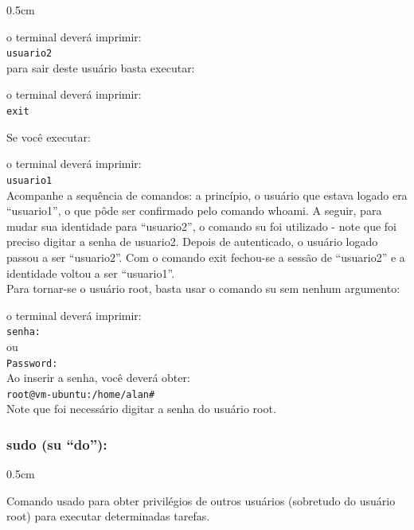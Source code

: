 \begin{refsection}
\begin {myindentpar}{0.5cm}
\begin{enumerate}[\itshape i.]
o terminal deverá imprimir:\\
\indent\indent\texttt{usuario2}
\\
para sair deste usuário basta executar:\\

o terminal deverá imprimir:\\
\texttt{exit}

Se você executar:\\

o terminal deverá imprimir:\\
\indent\indent\texttt{usuario1}\\

Acompanhe a sequência de comandos: a princípio, o usuário que estava logado era ``usuario1'', o que pôde ser confirmado pelo comando whoami. A seguir, para mudar sua identidade para ``usuario2'', o comando su foi utilizado - note que foi preciso digitar a senha de usuario2. Depois de autenticado, o usuário logado passou a ser ``usuario2''. Com o comando exit fechou-se a sessão de ``usuario2'' e a identidade voltou a ser ``usuario1''.\\

Para tornar-se o usuário root, basta usar o comando su sem nenhum argumento:

o terminal deverá imprimir:\\
\indent\indent\texttt{senha:}\\
ou\\
\indent\indent\texttt{Password:}\\
Ao inserir a senha, você deverá obter:\\
\indent\indent\texttt{root@vm-ubuntu:/home/alan\#}\\
Note que foi necessário digitar a senha do usuário root.\\
\end{enumerate}
\end{myindentpar}

\subsubsection{sudo (su ``do''):}\label{tut1:text_mode:commands:sudo}
\begin {myindentpar}{0.5cm}
\begin{enumerate}[\itshape i.]

Comando usado para obter privilégios de outros usuários (sobretudo do usuário root) para executar determinadas tarefas.\\


\end{enumerate}
\end{myindentpar}
\end{refsection}
